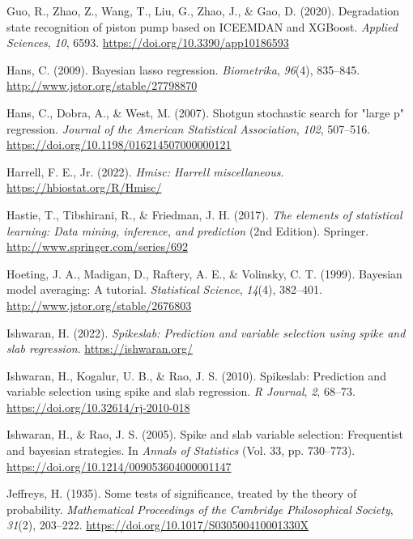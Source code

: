 \documentclass[
  11pt,
]{article}
\newlength{\cslhangindent}
\newlength{\cslentryspacingunit} %
\newenvironment{CSLReferences}[2] %
 {%
  \setlength{\parindent}{0pt}
  \ifodd #1
  \let\oldpar\par
  \def\par{\hangindent=\cslhangindent\oldpar}
  \fi
  \setlength{\parskip}{#2\cslentryspacingunit}
 }%
 {}
\begin{document}
\begin{CSLReferences}{1}{0}
\leavevmode{}%
Guo, R., Zhao, Z., Wang, T., Liu, G., Zhao, J., \& Gao, D. (2020).
Degradation state recognition of piston pump based on ICEEMDAN and
XGBoost. \emph{Applied Sciences}, \emph{10}, 6593.
\url{https://doi.org/10.3390/app10186593}

\leavevmode{}%
Hans, C. (2009). Bayesian lasso regression. \emph{Biometrika},
\emph{96}(4), 835--845. \url{http://www.jstor.org/stable/27798870}

\leavevmode{}%
Hans, C., Dobra, A., \& West, M. (2007). Shotgun stochastic search for
"large p" regression. \emph{Journal of the American Statistical
Association}, \emph{102}, 507--516.
\url{https://doi.org/10.1198/016214507000000121}

\leavevmode{}%
Harrell, F. E., Jr. (2022). \emph{Hmisc: Harrell miscellaneous}.
\url{https://hbiostat.org/R/Hmisc/}

\leavevmode{}%
Hastie, T., Tibshirani, R., \& Friedman, J. H. (2017). \emph{The
elements of statistical learning: Data mining, inference, and
prediction} (2nd Edition). Springer.
\url{http://www.springer.com/series/692}

\leavevmode{}%
Hoeting, J. A., Madigan, D., Raftery, A. E., \& Volinsky, C. T. (1999).
Bayesian model averaging: A tutorial. \emph{Statistical Science},
\emph{14}(4), 382--401. \url{http://www.jstor.org/stable/2676803}

\leavevmode{}%
Ishwaran, H. (2022). \emph{Spikeslab: Prediction and variable selection
using spike and slab regression}. \url{https://ishwaran.org/}

\leavevmode{}%
Ishwaran, H., Kogalur, U. B., \& Rao, J. S. (2010). Spikeslab:
Prediction and variable selection using spike and slab regression.
\emph{R Journal}, \emph{2}, 68--73.
\url{https://doi.org/10.32614/rj-2010-018}

\leavevmode{}%
Ishwaran, H., \& Rao, J. S. (2005). Spike and slab variable selection:
Frequentist and bayesian strategies. In \emph{Annals of Statistics}
(Vol. 33, pp. 730--773).
\url{https://doi.org/10.1214/009053604000001147}

\leavevmode{}%
Jeffreys, H. (1935). Some tests of significance, treated by the theory
of probability. \emph{Mathematical Proceedings of the Cambridge
Philosophical Society}, \emph{31}(2), 203--222.
\url{https://doi.org/10.1017/S030500410001330X}


\end{CSLReferences}
\end{document}
